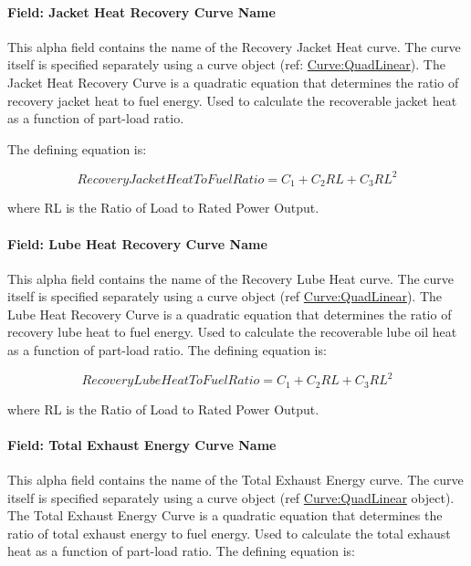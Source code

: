 \paragraph{Field: Jacket Heat Recovery Curve Name}\label{field-jacket-heat-recovery-curve-name}

This alpha field contains the name of the Recovery Jacket Heat curve. The curve itself is specified separately using a curve object (ref: \hyperref[curvequadlinear]{Curve:QuadLinear}). The Jacket Heat Recovery Curve is a quadratic equation that determines the ratio of recovery jacket heat to fuel energy. Used to calculate the recoverable jacket heat as a function of part-load ratio.

The defining equation is:

\begin{equation}
RecoveryJacketHeatToFuelRatio = {C_1} + {C_2}RL + {C_3}R{L^2}
\end{equation}

where RL is the Ratio of Load to Rated Power Output.

\paragraph{Field: Lube Heat Recovery Curve Name}\label{field-lube-heat-recovery-curve-name}

This alpha field contains the name of the Recovery Lube Heat curve. The curve itself is specified separately using a curve object (ref \hyperref[curvequadlinear]{Curve:QuadLinear}). The Lube Heat Recovery Curve is a quadratic equation that determines the ratio of recovery lube heat to fuel energy. Used to calculate the recoverable lube oil heat as a function of part-load ratio. The defining equation is:

\begin{equation}
RecoveryLubeHeatToFuelRatio = {C_1} + {C_2}RL + {C_3}R{L^2}
\end{equation}

where RL is the Ratio of Load to Rated Power Output.

\paragraph{Field: Total Exhaust Energy Curve Name}\label{field-total-exhaust-energy-curve-name}

This alpha field contains the name of the Total Exhaust Energy curve. The curve itself is specified separately using a curve object (ref \hyperref[curvequadlinear]{Curve:QuadLinear} object). The Total Exhaust Energy Curve is a quadratic equation that determines the ratio of total exhaust energy to fuel energy. Used to calculate the total exhaust heat as a function of part-load ratio. The defining equation is:

